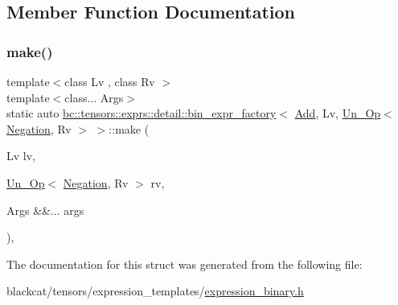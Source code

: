 \subsection{Member Function Documentation}
\mbox{\label{structbc_1_1tensors_1_1exprs_1_1detail_1_1bin__expr__factory_3_01Add_00_01Lv_00_01Un__Op_3_01Negation_00_01Rv_01_4_01_4_a944b39251590d4173c2b26fb485863e2}} 
\subsubsection{\texorpdfstring{make()}{make()}}
{\footnotesize\ttfamily template$<$class Lv , class Rv $>$ \\
template$<$class... Args$>$ \\
static auto \hyperlink{structbc_1_1tensors_1_1exprs_1_1detail_1_1bin__expr__factory}{bc\+::tensors\+::exprs\+::detail\+::bin\+\_\+expr\+\_\+factory}$<$ \hyperlink{structbc_1_1oper_1_1Add}{Add}, Lv, \hyperlink{structbc_1_1tensors_1_1exprs_1_1Un__Op}{Un\+\_\+\+Op}$<$ \hyperlink{structbc_1_1oper_1_1Negation}{Negation}, Rv $>$ $>$\+::make (\begin{DoxyParamCaption}\item[{Lv}]{lv,  }\item[{\hyperlink{structbc_1_1tensors_1_1exprs_1_1Un__Op}{Un\+\_\+\+Op}$<$ \hyperlink{structbc_1_1oper_1_1Negation}{Negation}, Rv $>$}]{rv,  }\item[{Args \&\&...}]{args }\end{DoxyParamCaption})\hspace{0.3cm}{\ttfamily [inline]}, {\ttfamily [static]}}



The documentation for this struct was generated from the following file\+:\begin{DoxyCompactItemize}
\item 
blackcat/tensors/expression\+\_\+templates/\hyperlink{expression__binary_8h}{expression\+\_\+binary.\+h}\end{DoxyCompactItemize}
